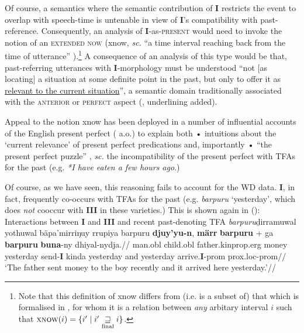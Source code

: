 \documentclass[11pt,dvipsnames]{report}
\begin{document}
Of course, a semantics where the semantic contribution of \textbf{I} restricts the event to overlap with speech-time is untenable in view of \textbf{I}'s compatibility with past-reference. Consequently, an analysis of \textbf{I}-as-\textsc{present} would need to invoke the notion of an \textsc{extended now} (\gls{xnow}, \textit{sc.} ``a time interval reaching back from the time of utterance'' \citep[49]{Cover2010}).\footnote{Note that this definition of \gls{xnow} differs from (i.e. is a subset of) that which is formalised in \citealt[225]{Stump1985}, for whom it is a relation between \textsl{any} arbitary interval $ i $ such that $ \textsc{xnow}(i) = \{i'\mid i'\underset{\text{final}}{\sqsupseteq} i\}$.}  A consequence of an analysis of this type would be that, past-referring utterances with \textbf{I}-morphology must be understood ``not [as locating] a situation at some definite point in the past, but only to offer it as \ul{relevant to the current situation}'', a semantic domain traditionally associated with the \textsc{anterior} or \textsc{perfect} aspect (\citealp[62]{Bybee1994}, underlining added).





  Appeal to the notion \gls{xnow} has been deployed in a number of influential accounts of the English present perfect (\citealp[notably][]{McCoard1978, Portner2003} a.o.) to explain both • intuitions about the `current relevance' of present perfect predications and, importantly • ``the present perfect puzzle'' \citep[see][]{Klein1992,Schaden2009}, \textit{sc.} the incompatibility of the present perfect with TFAs for the past (e.g. \textit{*I have eaten a few hours ago}.)

Of course, as we have seen, this reasoning fails to account for the WD data. \textbf{I}, in fact, frequently co-occurs with TFAs for the past (e.g. \textit{barpuru} `yesterday', which does \textit{not }cooccur with \textbf{III} in these varieties.) This is shown again in ():
\pex{}Interactions between \textbf{I} and \textbf{III} and recent past-denoting TFA \textit{barpuru}\a\begingl{}\gla ḏirramuwal yothuwal bäpa'mirriŋuy rrupiya barpuru \textbf{djuy'yu-n}, \textbf{märr} \textbf{barpuru} + ga \textbf{barpuru} \textbf{buna}-ny dhiyal-nydja.//
\glb man.\gls{obl} child.\gls{obl} father.\gls{kinprop}.\gls{erg} money yesterday send-\textbf{I} kinda yesterday and yesterday arrive.\textbf{I}-\gls{prom} \gls{prox}.\gls{loc}-\gls{prom}//
\glft`The father sent money to the boy recently and it arrived here yesterday.'//
\endgl
\end{document}
